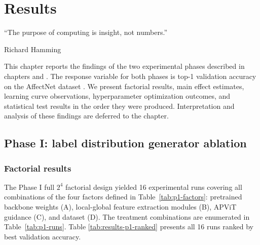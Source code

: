 \chapter{Results}
\epigraph{``The purpose of computing is insight, not numbers.''}{\vspace{10pt}Richard Hamming}
\label{chapter:results}
\newpage

This chapter reports the findings of the two experimental phases described in chapters  and . The response variable for both phases is top-1 validation accuracy on the AffectNet dataset \cite{affnet2019}. We present factorial results, main effect estimates, learning curve observations, hyperparameter optimization outcomes, and statistical test results in the order they were produced. Interpretation and analysis of these findings are deferred to the  chapter.

\section{Phase I: label distribution generator ablation}
\label{section:results-phase1}

\subsection{Factorial results}
\label{section:results-phase1-factorial}

The Phase I full $2^4$ factorial design yielded 16 experimental runs covering all combinations of the four factors defined in Table~\ref{tab:p1-factors}: pretrained backbone weights (A), local-global feature extraction modules (B), APViT guidance (C), and dataset (D). The treatment combinations are enumerated in Table~\ref{tab:p1-runs}. Table \ref{tab:results-p1-ranked} presents all 16 runs ranked by best validation accuracy.\\

